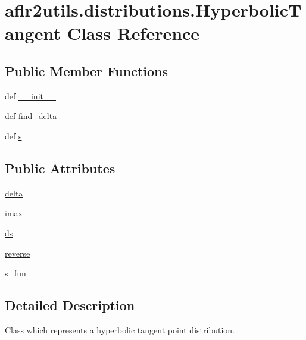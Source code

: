 \hypertarget{classaflr2utils_1_1distributions_1_1HyperbolicTangent}{\section{aflr2utils.\-distributions.\-Hyperbolic\-Tangent Class Reference}
\label{classaflr2utils_1_1distributions_1_1HyperbolicTangent}
}
\subsection*{Public Member Functions}
\begin{DoxyCompactItemize}
\item 
def \hyperlink{classaflr2utils_1_1distributions_1_1HyperbolicTangent_a336e8515de74f34ee8dc27dcb151264a}{\-\_\-\-\_\-init\-\_\-\-\_\-}
\item 
def \hyperlink{classaflr2utils_1_1distributions_1_1HyperbolicTangent_ac25f909658fdf3ff69915c82fae5e46e}{find\-\_\-delta}
\item 
def \hyperlink{classaflr2utils_1_1distributions_1_1HyperbolicTangent_a5ace9070d98b8a9eeb82af0cde146e4c}{s}
\end{DoxyCompactItemize}
\subsection*{Public Attributes}
\begin{DoxyCompactItemize}
\item 
\hyperlink{classaflr2utils_1_1distributions_1_1HyperbolicTangent_a62c92582f74b300c86e507ace7978136}{delta}
\item 
\hyperlink{classaflr2utils_1_1distributions_1_1HyperbolicTangent_a107f0c0b143dc60d389199978752e449}{imax}
\item 
\hyperlink{classaflr2utils_1_1distributions_1_1HyperbolicTangent_aff13c57a68e451d8b1cef9d423471828}{ds}
\item 
\hyperlink{classaflr2utils_1_1distributions_1_1HyperbolicTangent_af87ae831636e5c464793b51fe150de29}{reverse}
\item 
\hyperlink{classaflr2utils_1_1distributions_1_1HyperbolicTangent_a73e6bc6017220b4a5b32c178122814dc}{s\-\_\-fun}
\end{DoxyCompactItemize}


\subsection{Detailed Description}
\begin{DoxyVerb}Class which represents a hyperbolic tangent point distribution.\end{DoxyVerb}
 


